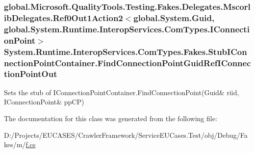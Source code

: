 \hypertarget{class_system_1_1_runtime_1_1_interop_services_1_1_com_types_1_1_fakes_1_1_stub_i_connection_point_container_a03a7ef2ae9962aab07b9c33bacbaf873}{
\subsubsection[{Find\-Connection\-Point\-Guid\-Ref\-I\-Connection\-Point\-Out}]{\setlength{\rightskip}{0pt plus 5cm}global.\-Microsoft.\-Quality\-Tools.\-Testing.\-Fakes.\-Delegates.\-Mscorlib\-Delegates.\-Ref0\-Out1\-Action2$<$global.\-System.\-Guid, global.\-System.\-Runtime.\-Interop\-Services.\-Com\-Types.\-I\-Connection\-Point$>$ System.\-Runtime.\-Interop\-Services.\-Com\-Types.\-Fakes.\-Stub\-I\-Connection\-Point\-Container.\-Find\-Connection\-Point\-Guid\-Ref\-I\-Connection\-Point\-Out}}\label{class_system_1_1_runtime_1_1_interop_services_1_1_com_types_1_1_fakes_1_1_stub_i_connection_point_container_a03a7ef2ae9962aab07b9c33bacbaf873}


Sets the stub of I\-Connection\-Point\-Container.\-Find\-Connection\-Point(Guid\& riid, I\-Connection\-Point\& pp\-C\-P)



The documentation for this class was generated from the following file\-:\begin{DoxyCompactItemize}
\item 
D\-:/\-Projects/\-E\-U\-C\-A\-S\-E\-S/\-Crawler\-Framework/\-Service\-E\-U\-Cases.\-Test/obj/\-Debug/\-Fakes/m/\hyperlink{m_2f_8cs}{f.\-cs}\end{DoxyCompactItemize}

